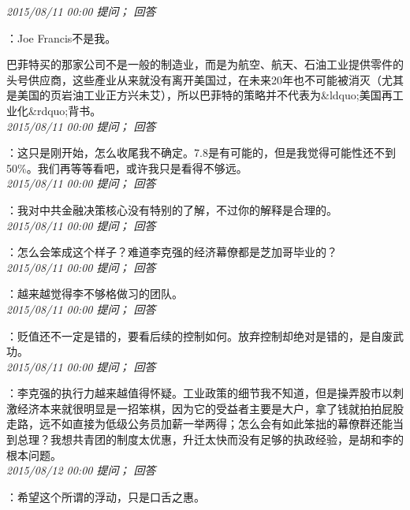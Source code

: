 \documentclass[twocolumn]{ctexart}
\begin{document}
\textit{\hfill\noindent\small 2015/08/11 00:00 提问； 回答}

：Joe Francis不是我。

巴菲特买的那家公司不是一般的制造业，而是为航空、航天、石油工业提供零件的头号供应商，这些產业从来就没有离开美国过，在未来20年也不可能被消灭（尤其是美国的页岩油工业正方兴未艾），所以巴菲特的策略并不代表为\&ldquo;美国再工业化\&rdquo;背书。\\

\textit{\hfill\noindent\small 2015/08/11 00:00 提问； 回答}

：这只是刚开始，怎么收尾我不确定。7.8是有可能的，但是我觉得可能性还不到50\%。我们再等等看吧，或许我只是看得不够远。\\

\textit{\hfill\noindent\small 2015/08/11 00:00 提问； 回答}

：我对中共金融决策核心没有特别的了解，不过你的解释是合理的。\\

\textit{\hfill\noindent\small 2015/08/11 00:00 提问； 回答}

：怎么会笨成这个样子？难道李克强的经济幕僚都是芝加哥毕业的？\\

\textit{\hfill\noindent\small 2015/08/11 00:00 提问； 回答}

：越来越觉得李不够格做习的团队。\\

\textit{\hfill\noindent\small 2015/08/11 00:00 提问； 回答}

：贬值还不一定是错的，要看后续的控制如何。放弃控制却绝对是错的，是自废武功。\\

\textit{\hfill\noindent\small 2015/08/11 00:00 提问； 回答}

：李克强的执行力越来越值得怀疑。工业政策的细节我不知道，但是操弄股市以刺激经济本来就很明显是一招笨棋，因为它的受益者主要是大户，拿了钱就拍拍屁股走路，远不如直接为低级公务员加薪一举两得；怎么会有如此笨拙的幕僚群还能当到总理？我想共青团的制度太优惠，升迁太快而没有足够的执政经验，是胡和李的根本问题。\\

\textit{\hfill\noindent\small 2015/08/12 00:00 提问； 回答}

：希望这个所谓的浮动，只是口舌之惠。\\
\end{document}
